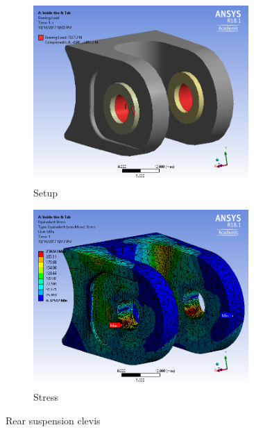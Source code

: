 \documentclass[10pt]{article}
\begin{document}
\begin{figure}[H]
\centering
\begin{subfigure}[b]{.48\textwidth}
\centering
\includegraphics[width=0.9\textwidth]{figures/fea/parts/MS00086-RearSuspensionClevisMount-Setup}
\caption{Setup}
\end{subfigure}
\begin{subfigure}[b]{.48\textwidth}
\centering
\includegraphics[width=0.9\textwidth]{figures/fea/parts/MS00086-RearSuspensionClevisMount-Stress}
\caption{Stress}
\end{subfigure}
\caption{Rear suspension clevis}
\label{fig:MS00086-RearSuspensionClevisMount}
\end{figure}
\end{document}
